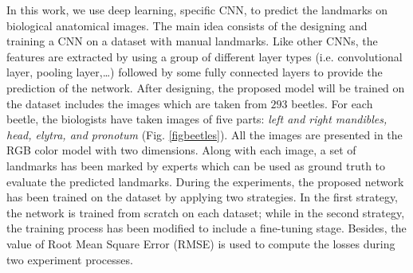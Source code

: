 \documentclass[review]{elsarticle}
\begin{document}
In this work, we use deep learning, specific CNN, to predict the landmarks on biological anatomical images. The main idea consists of the designing and training a CNN on a dataset with manual landmarks. Like other CNNs, the features are extracted by using a group of different layer types (i.e. convolutional layer, pooling layer,\ldots) followed by some fully connected layers to provide the prediction of the network. After designing, the proposed model will be trained on the dataset includes the images which are taken from $293$ beetles. For each beetle, the biologists have taken images of five parts: \textit{left and right mandibles, head, elytra, and pronotum} (Fig. \ref{figbeetles}). All the images are presented in the RGB color model with two dimensions. Along with each image, a set of landmarks has been marked by experts which can be used as ground truth to evaluate the predicted landmarks. During the experiments, the proposed network has been trained on the dataset by applying two strategies. In the first strategy, the network is trained from scratch on each dataset; while in the second strategy, the training process has been modified to include a fine-tuning \cite{yosinski2014transferable} stage. Besides, the value of Root Mean Square Error (RMSE) is used to compute the losses during two experiment processes.

\end{document}

